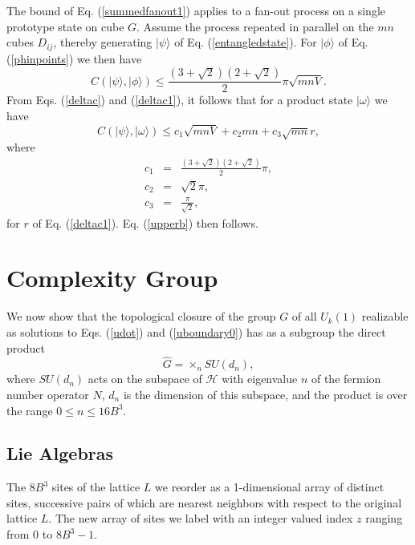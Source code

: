 \documentclass[12pt,amsmath,amssymb,onecolumn]{revtex4-2}
\begin{document}
The bound of Eq. (\ref{summedfanout1}) applies to a fan-out process on a 
single prototype state on cube $G$. Assume the process repeated in parallel on the
$mn$ cubes $D_{ij}$, thereby generating $|\psi \rangle $ of Eq. (\ref{entangledstate}).
For $|\phi \rangle $ of Eq. (\ref{phinpoints}) we then have
\begin{equation}
\label{psiphi}
C( |\psi \rangle , |\phi \rangle ) \le  \frac{(3 + \sqrt{2})(2+\sqrt{2})}{2} \pi \sqrt{mnV}.
\end{equation}
From Eqs. (\ref{deltac}) and (\ref{deltac1}), it follows that for a product state
$|\omega \rangle $ we have
\begin{equation}
\label{psiomega}
C(|\psi \rangle ,|\omega \rangle ) \le c_1 \sqrt{ mnV} + c_2 m n + c_3 \sqrt{mn} r, 
\end{equation}
where
\begin{subequations}
\begin{eqnarray}
\label{defc1}
c_1 & =&\frac{(3 + \sqrt{2})(2 + \sqrt{2})}{2} \pi  , \\
\label{defc2}
c_2 & = & \sqrt{2} \pi, \\
\label{defc32}
c_3 & = & \frac{\pi}{\sqrt{2}}, 
\end{eqnarray}
\end{subequations}
for $r$ of Eq. (\ref{deltac1}).
Eq. (\ref{upperb}) then follows. 



\section{\label{app:complexitygroup} Complexity Group}

We now show
that the topological closure of the group $G$ of all $U_k( 1)$ realizable as solutions to Eqs. (\ref{udot}) and
(\ref{uboundary0}) has as a subgroup the direct product
\begin{equation}
\label{formofga}
\hat{G} = \times_n SU(d_n),
\end{equation}
where $SU(d_n)$ acts on the subspace of $\mathcal{H}$
with eigenvalue $n$ of the fermion number operator $N$, 
$d_n$ is the dimension of this subspace, and
the product
is over the range $ 0 \le n \le 16 B^3$.

\subsection{\label{app:liealgebras} Lie Algebras}

The $8 B^3$ sites of the lattice $L$ we reorder as a 1-dimensional
array of distinct sites, successive pairs of which are 
nearest neighbors with respect to the original lattice $L$. 
The new array of sites we label with an integer valued index $z$
ranging from 0 to $8 B^3 -1$. 
\end{document}
